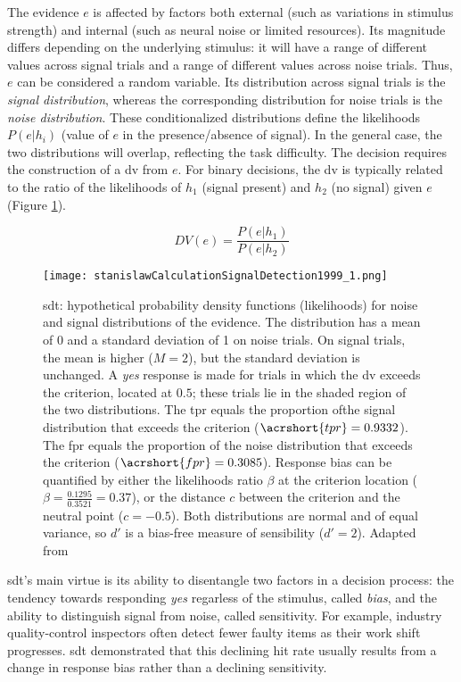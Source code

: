 The evidence $e$ is affected by factors both external (such as variations in stimulus strength) and internal (such as neural noise or limited resources). Its magnitude differs depending on the underlying stimulus: it will have a range of different values across signal trials and a range of different values across noise trials. Thus, $e$ can be considered a random variable. Its distribution across signal trials is the \textit{signal distribution}, whereas the corresponding distribution for noise trials is the \textit{noise distribution}. These conditionalized distributions define the likelihoods $P(e|h_i)$ (value of $e$ in the presence/absence of signal). In the general case, the two distributions will overlap, reflecting the task difficulty. The decision requires the construction of a \acrlong{dv} from $e$. For binary decisions, the \acrshort{dv} is typically related to the ratio of the likelihoods of $h_1$ (signal present) and $h_2$ (no signal) given $e$ (Figure \ref{figure:sdt}).

$$DV(e) = \frac{P(e|h_1)}{P(e|h_2)}$$

\begin{figure}[ht]
    \centering
    \texttt{[image: stanislawCalculationSignalDetection1999\_1.png]}
    \caption[\acrlong{sdt}: graphical formalism]{\acrlong{sdt}: hypothetical probability density functions (likelihoods) for noise and signal distributions of the evidence. The distribution has a mean of 0 and a standard deviation of 1 on noise trials. On signal trials, the mean is higher ($M = 2$), but the standard deviation is unchanged. A \textit{yes} response is made for trials in which the \acrlong{dv} exceeds the criterion, located at $0.5$; these trials lie in the shaded region of the two distributions. The \acrlong{tpr} equals the proportion ofthe signal distribution that exceeds the criterion ($\acrshort{tpr} = 0.9332$). The \acrlong{fpr} equals the proportion of the noise distribution that exceeds the criterion ($\acrshort{fpr} = 0.3085$). Response bias can be quantified by either the likelihoods ratio $\beta$ at the criterion location ($\beta = \frac{0.1295}{0.3521} = 0.37$), or the distance $c$ between the criterion and the neutral point ($c = -0.5$). Both distributions are normal and of equal variance, so $d'$ is a bias-free measure of sensibility ($d'=2$). Adapted from \cite{myersPracticalIntroductionUsing2022}}
    \label{figure:sdt}
\end{figure}

\acrlong{sdt}'s main virtue is its ability to disentangle two factors in a decision process: the tendency towards responding \textit{yes} regarless of the stimulus, called \textit{bias}, and the ability to distinguish signal from noise, called \gls{sensitivity}. For example, industry quality-control inspectors often detect fewer faulty items as their work shift progresses. \Acrshort{sdt} demonstrated that this declining hit rate usually results from a change in response bias rather than a declining \gls{sensitivity}.

